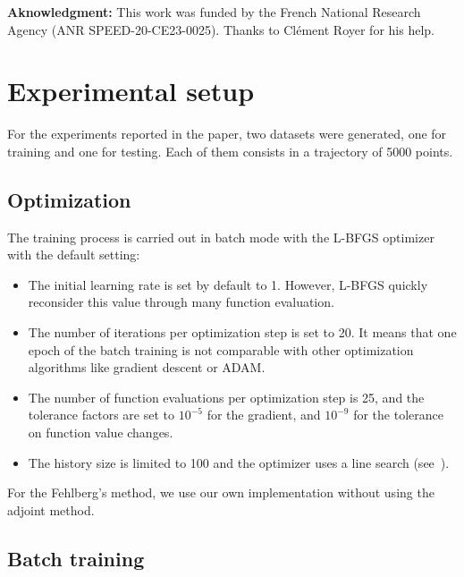 \documentclass{article}
\begin{document}
\textbf{Aknowledgment:} This work was funded by the French National Research Agency (ANR
SPEED-20-CE23-0025). Thanks to Clément Royer for his help.





\clearpage
\appendix

\section{Experimental setup}
\label{sec:setup}
For the experiments reported in the paper, two datasets were generated, one for training and one for testing. Each
of them consists in a trajectory of 5000 points.




\subsection{Optimization}
\label{ssec:optim}

The training process is carried out in batch mode with the L-BFGS
optimizer with the default setting:
\begin{itemize}
\item The initial learning rate is set by default to 1. However,
  L-BFGS quickly reconsider this value through many function
  evaluation.
\item The number of iterations per optimization step is set to 20. It
  means that one epoch of the batch training is not comparable with
  other optimization algorithms like gradient descent or ADAM.
\item The number of function evaluations per optimization step is 25,
  and the tolerance factors are set to $10^{-5}$ for the gradient, and
  $10^{-9}$ for the tolerance on function value changes.
\item The history size is limited to 100 and the optimizer uses a line
  search (see~\cite{Liu89LBFGS}).
\end{itemize}

For the Fehlberg's method, we use our own implementation without using
the adjoint method.


\subsection{Batch training}
\label{ssec:batch}
\end{document}
